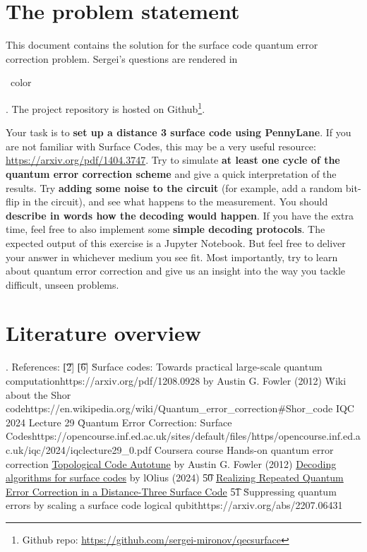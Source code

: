 \section{The problem statement}

This document contains the solution for the surface code quantum error correction problem. Sergei's
questions are rendered in \begin{\QuestionColor}\QuestionColorName\ color\end{\QuestionColor}. The
project repository is hosted on
Github\footnote{Github repo: \url{https://github.com/sergei-mironov/qecsurface}}.

\vsp

Your task is to \textbf{set up a distance 3 surface code using PennyLane}. If you are not familiar
with Surface Codes, this may be a very useful resource: \url{https://arxiv.org/pdf/1404.3747}. Try
to simulate \textbf{at least one cycle of the quantum error correction scheme} and give a quick
interpretation of the results. Try \textbf{adding some noise to the circuit} (for example, add a
random bit-flip in the circuit), and see what happens to the measurement. You should
\textbf{describe in words how the decoding would happen}. If you have the extra time, feel free to
also implement some \textbf{simple decoding protocols}. The expected output of this exercise is a
Jupyter Notebook. But feel free to deliver your answer in whichever medium you see fit. Most
importantly, try to learn about quantum error correction and give us an insight into the way you
tackle difficult, unseen problems.


\section{Literature overview}

\ls {}. References:
    \ls \t{[2]} 
    \li \t{[6]} \u{Surface codes: Towards practical large-scale quantum computation}{https://arxiv.org/pdf/1208.0928}
        by Austin G. Fowler (2012)
    \le
\li \u{Wiki about the Shor code}{https://en.wikipedia.org/wiki/Quantum_error_correction\#Shor_code}
\li IQC 2024 Lecture 29 \u{Quantum Error Correction: Surface Codes}{https://opencourse.inf.ed.ac.uk/sites/default/files/https/opencourse.inf.ed.ac.uk/iqc/2024/iqclecture29_0.pdf}
\li Coursera course Hands-on quantum error correction
    \ls \href{https://journals.aps.org/prx/pdf/10.1103/PhysRevX.2.041003}{Topological Code Autotune}
        by Austin G. Fowler (2012)
    \le
\li \href{https://arxiv.org/abs/2307.14989}{Decoding algorithms for surface codes} by lOlius (2024)
    \ls \t{50} \href{https://arxiv.org/abs/2112.03708}{Realizing Repeated Quantum Error Correction in a Distance-Three Surface Code}
    \li \t{51} \u{Suppressing quantum errors by scaling a surface code logical qubit}{https://arxiv.org/abs/2207.06431}
    \le
\li {}
\le


